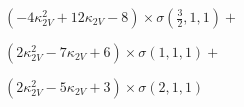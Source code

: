 $\left(- 4 \kappa_{2V}^{2} + 12 \kappa_{2V} - 8\right) \times \sigma{\left(\frac{3}{2},1,1 \right)} +$

$ \left(2 \kappa_{2V}^{2} - 7 \kappa_{2V} + 6\right) \times \sigma{\left(1,1,1 \right)} +$

$ \left(2 \kappa_{2V}^{2} - 5 \kappa_{2V} + 3\right) \times \sigma{\left(2,1,1 \right)}$
